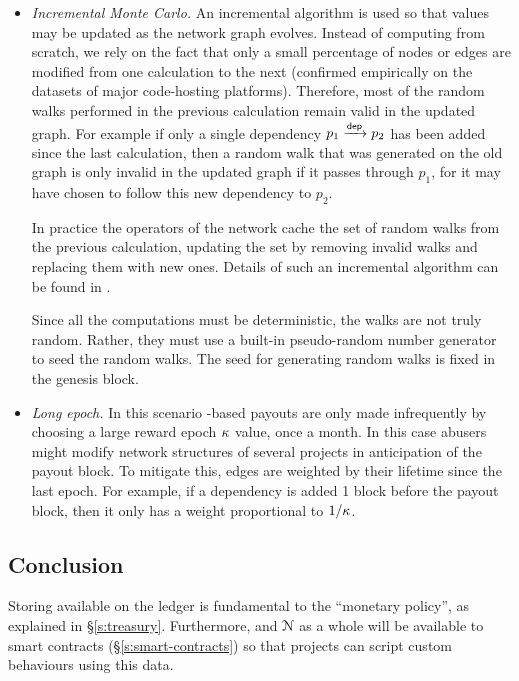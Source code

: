 \begin{itemize}
\item \emph{Incremental Monte Carlo.} An incremental algorithm is used so that
  \osrank{} values may be updated as the network graph evolves. Instead of
  computing \osrank{} from scratch, we rely on the fact that only a small
  percentage of nodes or edges are modified
  from one calculation to the next (confirmed empirically on the datasets of
  major code-hosting platforms). Therefore, most of the random walks
  performed in the previous calculation remain valid in the updated graph. For
  example if only a single dependency $p_1 \xrightarrow[]{\mathsf{dep}} p_2$ has been
  added since the last calculation, then a random walk that was generated on the
  old graph is only invalid in the updated graph if it passes through $p_1$, for
  it may have chosen to follow this new dependency to $p_2$.


  In practice the operators of the network cache the set of random
  walks from the previous calculation, updating the set by removing
  invalid walks and replacing them with new ones. Details of such an
  incremental \pagerank{} algorithm can be found
  in \cite{incr pagerank}.

  Since all the computations must be deterministic, the walks are not
  truly random. Rather, they must use a built-in pseudo-random number
  generator to seed the random walks. The seed for generating
  random walks is fixed in the genesis block.



\item \emph{Long epoch.} In this scenario
  \osrank{}-based payouts are only made infrequently by choosing a large
  reward epoch $\kappa$ value, \eg once a month. In this case
  abusers might modify network structures of several projects in
  anticipation of the payout block. To mitigate this, edges are
  weighted by their lifetime since the last epoch. For
  example, if a dependency is added 1 block before the payout block,
  then it only has a weight proportional to $1/\kappa$.
\end{itemize}

\subsection{Conclusion}

Storing \osrank{} available on the ledger is fundamental to the \oscoin{}
``monetary policy'', as explained in \S \ref{s:treasury}. Furthermore,
\osrank{} and $\mathcal{N}$ as a whole will be available to smart contracts
(\S\ref{s:smart-contracts}) so that projects can script custom behaviours using
this data.
